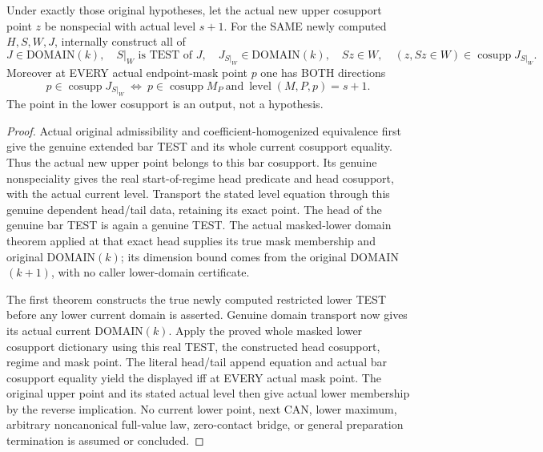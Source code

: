 \begin{theorem}
\label{hir:original-prepared-current-positive-lower-domain-point}
\leanok
Under exactly those original hypotheses, let the actual new upper cosupport
point $z$ be nonspecial with actual level $s+1$. For the SAME newly computed
$H,S,W,J$, internally construct all of
\[
 J\in\mathrm{DOMAIN}(k),\quad S|_W\text{ is TEST of }J,\quad
 J_{S|_W}\in\mathrm{DOMAIN}(k),\quad
 Sz\in W,\quad (z,Sz\in W)\in\operatorname{cosupp}J_{S|_W}.
\]
Moreover at EVERY actual endpoint-mask point $p$ one has BOTH directions
\[
 p\in\operatorname{cosupp}J_{S|_W}\ \Longleftrightarrow\
 p\in\operatorname{cosupp}M_P\ \text{and}\
 \operatorname{level}(M,P,p)=s+1.
\]
The point in the lower cosupport is an output, not a hypothesis.
\end{theorem}
\begin{proof}
Actual original admissibility and coefficient-homogenized equivalence first
give the genuine extended bar TEST and its whole current cosupport equality.
Thus the actual new upper point belongs to this bar cosupport. Its genuine
nonspeciality gives the real start-of-regime head predicate and head
cosupport, with the actual current level. Transport the stated level equation
through this genuine dependent head/tail data, retaining its exact point.
The head of the genuine bar TEST is again a genuine TEST. The actual
masked-lower domain theorem applied at that exact head supplies its true
mask membership and original DOMAIN$(k)$; its dimension bound comes from the
original DOMAIN$(k+1)$, with no caller lower-domain certificate.

The first theorem constructs the true newly computed restricted lower TEST
before any lower current domain is asserted. Genuine domain transport now
gives its actual current DOMAIN$(k)$. Apply the proved whole masked lower
cosupport dictionary using this real TEST, the constructed head cosupport,
regime and mask point. The literal head/tail append equation and actual bar
cosupport equality yield the displayed iff at EVERY actual mask point.
The original upper point and its stated actual level then give actual lower
membership by the reverse implication. No current lower point, next CAN,
lower maximum, arbitrary noncanonical full-value law, zero-contact bridge,
or general preparation termination is assumed or concluded.
\end{proof}
